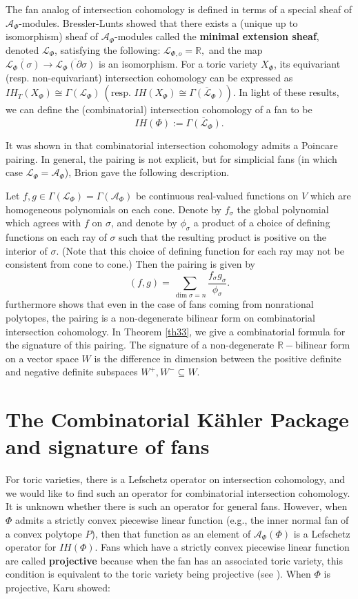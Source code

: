 \documentclass[12pt,leqno,twoside]{amsart}
\newcommand{\R}{\mathbb{R}}
\begin{document}
The fan analog of intersection cohomology is defined in terms of a special sheaf of $\mathcal{A}_\Phi$-modules. Bressler-Lunts \cite{BL} showed that there exists a (unique up to isomorphism) sheaf of $\mathcal{A}_\Phi$-modules called the \textbf{minimal extension sheaf}, denoted $\mathcal{L}_\Phi$, satisfying the following:
$\mathcal{L}_{\Phi,o}=\R,$ and the map $\overline{\mathcal{L}_{\Phi}(\sigma)}\rightarrow\overline{\mathcal{L}_\Phi(\partial\sigma)}$ is an isomorphism. For a toric variety $X_\Phi$, its equivariant (resp.  non-equivariant) intersection cohomology can be expressed as $IH_T(X_\Phi)\cong \Gamma(\mathcal{L}_{\Phi}) \ (\text{resp. } IH(X_\Phi)\cong\overline{\Gamma(\mathcal{L}_\Phi)})$. In light of these results, we can define the (combinatorial) intersection cohomology of a fan to be $$IH(\Phi):=\overline{\Gamma(\mathcal{L}_\Phi)}.$$

It was shown in \cite[Theorem 6.3]{BBFK} that combinatorial intersection cohomology admits a Poincare pairing. In general, the pairing is not explicit, but for simplicial fans (in which case $\mathcal{L}_\Phi=\mathcal{A}_\Phi$), Brion \cite{Bri} gave the following description.

Let $f,g\in \Gamma(\mathcal{L}_\Phi)=\Gamma(\mathcal{A}_\Phi)$ be continuous real-valued functions on $V$ which are homogeneous polynomials on each cone. Denote by $f_\sigma$ the global polynomial which agrees with $f$ on $\sigma$, and denote by $\phi_\sigma$ a product of a choice of defining functions on each ray of $\sigma$ such that the resulting product is positive on the interior of $\sigma$. (Note that this choice of defining function for each ray may not be consistent from cone to cone.) Then the pairing is given by $$(f,g)=\sum_{\dim\sigma=n}\frac{f_\sigma g_\sigma}{\phi_\sigma}.$$
\cite{BBFK} furthermore shows that even in the case of fans coming from nonrational polytopes, the pairing is a non-degenerate bilinear form on combinatorial intersection cohomology. In Theorem \ref{th33}, we give a combinatorial formula for the signature of this pairing. The signature of a non-degenerate $\R-$bilinear form on a vector space $W$ is the difference in dimension between the positive definite and negative definite subspaces $W^+,W^-\subseteq W.$

\section{The Combinatorial K\"ahler Package and signature of fans}

For toric varieties, there is a Lefschetz operator on intersection cohomology, and we would like to find such an operator for combinatorial intersection cohomology. It is unknown whether there is such an operator for general fans. However, when $\Phi$ admits a strictly convex piecewise linear function (e.g., the inner normal fan of a convex polytope $P$), then that function as an element of $\mathcal{A}_{\Phi}(\Phi)$ is a Lefschetz operator for $IH(\Phi)$. Fans which have a strictly convex piecewise linear function are called \textbf{projective} because when the fan has an associated toric variety, this condition is equivalent to the toric variety being projective (see \cite[6.9]{D}). When $\Phi$ is projective, Karu \cite[Theorem 0.1]{K} showed:
\end{document}
